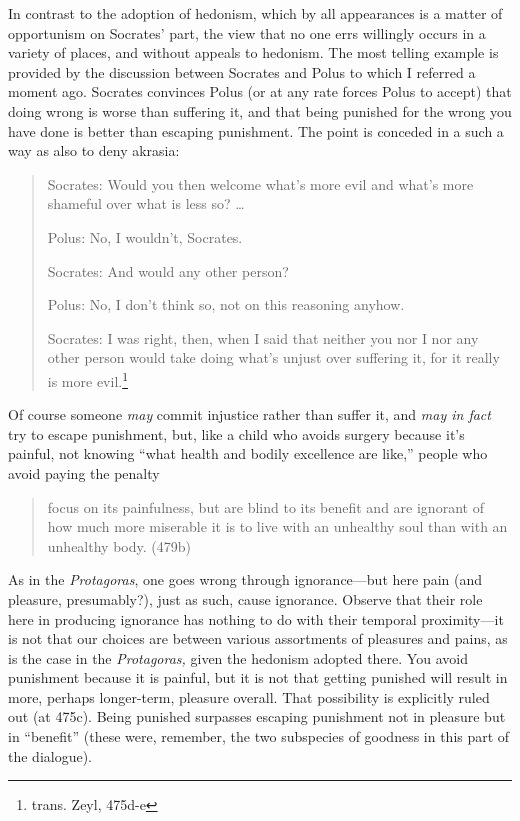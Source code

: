\documentclass[11pt]{amsart}
\begin{document}
In contrast to the adoption of hedonism, which by all appearances is a
matter of opportunism on Socrates' part, the view that no one errs
willingly occurs in a variety of places, and without appeals to
hedonism. The most telling example is provided by the discussion
between Socrates and Polus to which I referred a moment ago. Socrates
convinces Polus (or at any rate forces Polus to accept) that doing
wrong is worse than suffering it, and that being punished for the
wrong you have done is better than escaping punishment. The point is
conceded in a such a way as also to deny
akrasia:\begin{quote}Socrates: Would you then welcome what's more evil
and what's more shameful over what is less so? \ldots

\noindent Polus: No, I wouldn't, Socrates.

\noindent Socrates: And would any other person?

\noindent Polus: No, I don't think so, not on this reasoning anyhow.

\noindent Socrates: I was right, then, when I said that neither you
nor I nor any other person would take doing what's unjust over
suffering it, for it really is more evil.\footnote{trans. Zeyl,
475d-e}\end{quote} Of course someone \emph{may} commit injustice
rather than suffer it, and \emph{may in fact} try to escape
punishment, but, like a child who avoids surgery because it's painful,
not knowing ``what health and bodily excellence are like,'' people who
avoid paying the penalty \begin{quote}focus on its painfulness, but
are blind to its benefit and are ignorant of how much more miserable
it is to live with an unhealthy soul than with an unhealthy body.
(479b)\end{quote} As in the \emph{Protagoras}, one goes wrong through
ignorance---but here pain (and pleasure, presumably?), just as such,
cause ignorance. Observe that their role here in producing ignorance
has nothing to do with their temporal proximity---it is not that our
choices are between various assortments of pleasures and pains, as is
the case in the \emph{Protagoras,} given the hedonism adopted there.
You avoid punishment because it is painful, but it is not that getting
punished will result in more, perhaps longer-term, pleasure overall.
That possibility is explicitly ruled out (at 475c). Being punished
surpasses escaping punishment not in pleasure but in ``benefit''
(these were, remember, the two subspecies of goodness in this part of
the dialogue).
\end{document}

